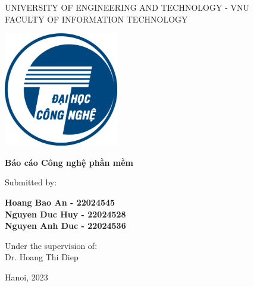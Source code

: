 
\begin{center} \centering
    {UNIVERSITY OF ENGINEERING AND TECHNOLOGY - VNU}\\
    {FACULTY OF INFORMATION TECHNOLOGY}\\
\end{center}


\vspace{15 mm}

\begin{center}
\includegraphics[width = 3\linewidth, height = 5cm, keepaspectratio]{figures/uet.png}
\begin{spacing}{1.5}
\textbf{\large {Báo cáo Công nghệ phần mềm}}\\
\end{spacing}
\vspace{10 mm}

\begin{spacing}{2.0}
\textbf{\LARGE {}}
\end{spacing}

\vspace{15 mm}

\begin{spacing}{0.8}
\medskip
{\large {Submitted by:}}
\end{spacing}
\end{center}


\begin{center}
\begin{spacing}{0.6}
\textbf{\Large {Hoang Bao An - 22024545}}\\
\textbf{\Large {Nguyen Duc Huy - 22024528}}\\
\textbf{\Large {Nguyen Anh Duc - 22024536}}\\
\end{spacing}
\end{center}

\vspace{5 mm}
\begin{center}
\begin{spacing}{1.3}
{Under the supervision of:}\\
    {\large {Dr. Hoang Thi Diep}}\\
\end{spacing}
\end{center}

\vspace{15 mm}
\begin{center}
    \large {Hanoi, 2023}
\end{center}

